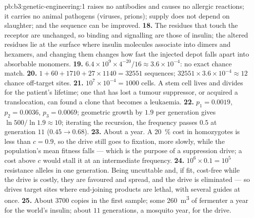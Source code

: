 \begin{solution}{pb:b3:genetic-engineering:1}
raises no antibodies and causes no allergic reactions; it carries no
animal pathogens (viruses, prions); supply does not depend on slaughter;
and the sequence can be improved.
\textbf{18.} The residues that touch the receptor are unchanged, so
binding and signalling are those of insulin; the altered residues lie
at the surface where insulin molecules associate into dimers and
hexamers, and changing them changes how fast the injected depot falls
apart into absorbable monomers.
\textbf{19.} $6.4\times 10^{9}\times 4^{-20}/16 \approx 3.6\times
10^{-4}$: no exact chance match.
\textbf{20.} $1 + 60 + 1710 + 27\times 1140 = \num{32551}$ sequences;
$\num{32551}\times 3.6\times 10^{-4} \approx 12$ chance off-target
sites.
\textbf{21.} $10^{7}\times 10^{-4} = 1000$ cells. A stem cell lives and
divides for the patient's lifetime; one that has lost a tumour
suppressor, or acquired a translocation, can found a clone that becomes
a leukaemia.
\textbf{22.} $p_{1} = 0.0019$, $p_{2} = 0.0036$, $p_{3} = 0.0069$;
geometric growth by $1.9$ per generation gives $\ln 500/\ln 1.9
\approx 10$; iterating the recursion, the frequency passes $0.5$ at
generation $11$ ($0.45 \to 0.68$).
\textbf{23.} About a year. A \qty{20}{\%} cost in homozygotes is less
than $c = 0.9$, so the drive still goes to fixation, more slowly, while
the population's mean fitness falls --- which is the purpose of a
suppression drive; a cost above $c$ would stall it at an intermediate
frequency.
\textbf{24.} $10^{6}\times 0.1 = 10^{5}$ resistance alleles in one
generation. Being uncuttable and, if fit, cost-free while the drive is
costly, they are favoured and spread, and the drive is eliminated --- so
drives target sites where end-joining products are lethal, with several
guides at once.
\textbf{25.} About $3700$ copies in the first sample; some \qty{260}{m^3}
of fermenter a year for the world's insulin; about $11$ generations, a
mosquito year, for the drive.
\end{solution}
